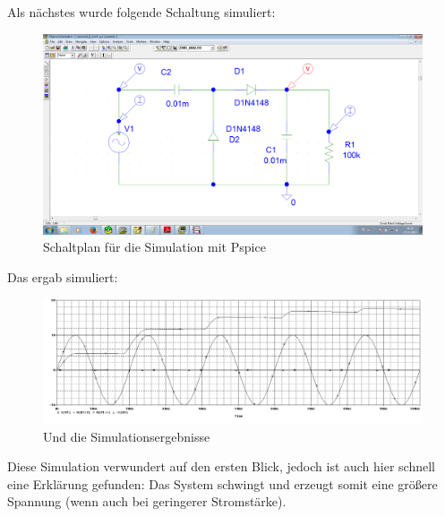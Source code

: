 Als nächstes wurde folgende Schaltung simuliert:
\begin{figure}[H]
	\centering
	\includegraphics[width=\linewidth]{versuch2/spice/v2_6_3_schematic.png}
	\caption{Schaltplan für die Simulation mit Pspice}
\end{figure}
Das ergab simuliert:
\begin{figure}[H]
	\centering
	\includegraphics[width=\linewidth]{versuch2/spice/v2_6_3_simulation.png}
	\caption{Und die Simulationsergebnisse}
\end{figure}
Diese Simulation verwundert auf den ersten Blick, jedoch ist auch hier schnell eine Erklärung gefunden: Das System schwingt und erzeugt somit eine größere Spannung (wenn auch bei geringerer Stromstärke).

